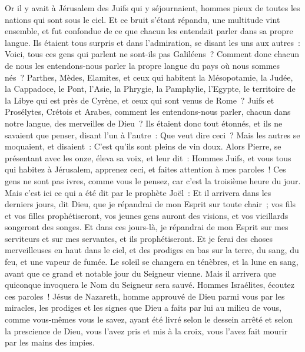 \begin{multicols}{2}
Or il y avait à Jérusalem des Juifs qui y séjournaient, hommes pieux de toutes les nations qui sont sous le ciel.
Et ce bruit s'étant répandu, une multitude vint ensemble, et fut confondue de ce que chacun les entendait parler dans sa propre langue. 
Ils étaient tous surpris et dans l'admiration, se disant les uns aux autres~: Voici, tous ces gens qui parlent ne sont-ils pas Galiléens~?
Comment donc chacun de nous les entendons-nous parler la propre langue du pays où nous sommes nés~? 
Parthes, Mèdes, Elamites, et ceux qui habitent la Mésopotamie, la Judée, la Cappadoce, le Pont, l'Asie,
la Phrygie, la Pamphylie, l'Egypte, le territoire de la Libye qui est près de Cyrène, et ceux qui sont venus de Rome~? Juifs et Prosélytes,
Crétois et Arabes, comment les entendons-nous parler, chacun dans notre langue, des merveilles de Dieu~?
Ils étaient donc tout étonnés, et ils ne savaient que penser, disant l'un à l'autre~: Que veut dire ceci~?
Mais les autres se moquaient, et disaient~: C'est qu'ils sont pleins de vin doux.
Alors Pierre, se présentant avec les onze, éleva sa voix, et leur dit~: Hommes Juifs, et vous tous qui habitez à Jérusalem, apprenez ceci, et faites attention à mes paroles~!
Ces gens ne sont pas ivres, comme vous le pensez, car c'est la troisième heure du jour.
Mais c'est ici ce qui a été dit par le prophète Joël~:
Et il arrivera dans les derniers jours, dit Dieu, que je répandrai de mon Esprit sur toute chair~; vos fils et vos filles prophétiseront, vos jeunes gens auront des visions, et vos vieillards songeront des songes.
Et dans ces jours-là, je répandrai de mon Esprit sur mes serviteurs et sur mes servantes, et ils prophétiseront.
Et je ferai des choses merveilleuses en haut dans le ciel, et des prodiges en bas sur la terre, du sang, du feu, et une vapeur de fumée.
Le soleil se changera en ténèbres, et la lune en sang, avant que ce grand et notable jour du Seigneur vienne.
Mais il arrivera que quiconque invoquera le Nom du Seigneur sera sauvé.
Hommes Israélites, écoutez ces paroles~! Jésus de Nazareth, homme approuvé de Dieu parmi vous par les miracles, les prodiges et les signes que Dieu a faits par lui au milieu de vous, comme vous-mêmes vous le savez,
ayant été livré selon le dessein arrêté et selon la prescience de Dieu, vous l'avez pris et mis à la croix, vous l'avez fait mourir par les mains des impies.

\end{multicols}
